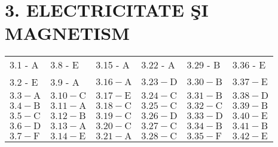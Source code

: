 
\section*{3. ELECTRICITATE ŞI MAGNETISM}
\begin{center}
\begin{tabular}{llllll}
3.1 - A & 3.8 - E & 3.15 - A & 3.22 - A & 3.29 - B & 3.36 - E \\
3.2 - E & 3.9 - A & $3.16-\mathrm{A}$ & $3.23-\mathrm{D}$ & $3.30-\mathrm{B}$ & $3.37-\mathrm{E}$ \\
$3.3-\mathrm{A}$ & $3.10-\mathrm{C}$ & $3.17-\mathrm{E}$ & $3.24-\mathrm{C}$ & $3.31-\mathrm{B}$ & $3.38-\mathrm{D}$ \\
$3.4-\mathrm{B}$ & $3.11-\mathrm{A}$ & $3.18-\mathrm{C}$ & $3.25-\mathrm{C}$ & $3.32-\mathrm{C}$ & $3.39-\mathrm{B}$ \\
$3.5-\mathrm{C}$ & $3.12-\mathrm{B}$ & $3.19-\mathrm{C}$ & $3.26-\mathrm{D}$ & $3.33-\mathrm{D}$ & $3.40-\mathrm{E}$ \\
$3.6-\mathrm{D}$ & $3.13-\mathrm{A}$ & $3.20-\mathrm{C}$ & $3.27-\mathrm{C}$ & $3.34-\mathrm{B}$ & $3.41-\mathrm{B}$ \\
$3.7-\mathrm{F}$ & $3.14-\mathrm{E}$ & $3.21-\mathrm{A}$ & $3.28-\mathrm{C}$ & $3.35-\mathrm{F}$ & $3.42-\mathrm{E}$ \\
\end{tabular}
\end{center}

